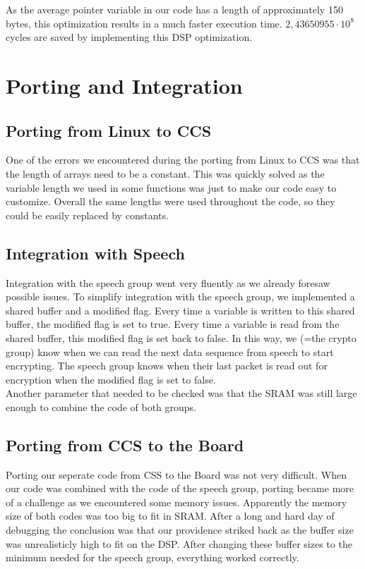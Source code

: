 \documentclass[a4paper]{article}
\begin{document}
As the average pointer variable in our code has a length of approximately 150 bytes, this optimization results in a much faster execution time. $2,43650955\cdot10^{8}$ cycles are saved by implementing this DSP optimization.

\section{Porting and Integration}

\subsection{Porting from Linux to CCS}
One of the errors we encountered during the porting from Linux to CCS was that the length of arrays need to be a constant. This was quickly solved as the variable length we used in some functions was just to make our code easy to customize. Overall the same lengths were used throughout the code, so they could be easily replaced by constants.

\subsection{Integration with Speech}
Integration with the speech group went very fluently as we already foresaw possible issues. To simplify integration with the speech group, we implemented a shared buffer and a modified flag. Every time a variable is written to this shared buffer, the modified flag is set to true. Every time a variable is read from the shared buffer, this modified flag is set back to false. In this way, we (=the crypto group) know when we can read the next data sequence from speech to start encrypting. The speech group knows when their last packet is read out for encryption when the modified flag is set to false.\\

Another parameter that needed to be checked was that the SRAM was still large enough to combine the code of both groups.

\subsection{Porting from CCS to the Board}
Porting our seperate code from CSS to the Board was not very difficult. When our code was combined with the code of the speech group, porting became more of a challenge as we encountered some memory issues. Apparently the memory size of both codes was too big to fit in SRAM. After a long and hard day of debugging the conclusion was that our providence striked back as the buffer size was unrealisticly high to fit on the DSP. After changing these buffer sizes to the minimum needed for the speech group, everything worked correctly.
\end{document}
